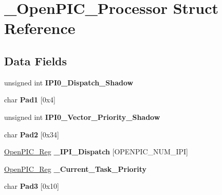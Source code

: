 \hypertarget{struct__OpenPIC__Processor}{}\section{\+\_\+\+Open\+P\+I\+C\+\_\+\+Processor Struct Reference}
\label{struct__OpenPIC__Processor}
\subsection*{Data Fields}
\begin{DoxyCompactItemize}
\item 
\mbox{\label{struct__OpenPIC__Processor_aabd6565994dcb03ce548bb174334f1fe}} 
unsigned int {\bfseries I\+P\+I0\+\_\+\+Dispatch\+\_\+\+Shadow}
\item 
\mbox{\label{struct__OpenPIC__Processor_ac30612c10244647318dffcdaafdda493}} 
char {\bfseries Pad1} \mbox{[}0x4\mbox{]}
\item 
\mbox{\label{struct__OpenPIC__Processor_aeddd538d4e7ec2832d03167ca679276b}} 
unsigned int {\bfseries I\+P\+I0\+\_\+\+Vector\+\_\+\+Priority\+\_\+\+Shadow}
\item 
\mbox{\label{struct__OpenPIC__Processor_a4952b21dcc35f0557eecba4274a01f2b}} 
char {\bfseries Pad2} \mbox{[}0x34\mbox{]}
\item 
\mbox{\label{struct__OpenPIC__Processor_a0099a11d9ef9bd86e12c594d140954af}} 
\mbox{\hyperlink{struct__OpenPIC__Reg}{Open\+P\+I\+C\+\_\+\+Reg}} {\bfseries \+\_\+\+I\+P\+I\+\_\+\+Dispatch} \mbox{[}O\+P\+E\+N\+P\+I\+C\+\_\+\+N\+U\+M\+\_\+\+I\+PI\mbox{]}
\item 
\mbox{\label{struct__OpenPIC__Processor_a4ca32158d529630a76625efcbc13a9e3}} 
\mbox{\hyperlink{struct__OpenPIC__Reg}{Open\+P\+I\+C\+\_\+\+Reg}} {\bfseries \+\_\+\+Current\+\_\+\+Task\+\_\+\+Priority}
\item 
\mbox{\label{struct__OpenPIC__Processor_a4ad02d6916b3045e03225350b0c206bb}} 
char {\bfseries Pad3} \mbox{[}0x10\mbox{]}
\item 

\end{DoxyCompactItemize}
